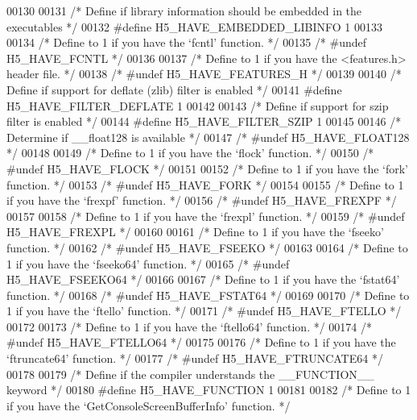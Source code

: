 \begin{DoxyCode}
{00130 
00131 \textcolor{comment}{/* Define if library information should be embedded in the executables */}
00132 \textcolor{preprocessor}{#define H5\_HAVE\_EMBEDDED\_LIBINFO 1}
00133 
00134 \textcolor{comment}{/* Define to 1 if you have the `fcntl' function. */}
00135 \textcolor{comment}{/* #undef H5\_HAVE\_FCNTL */}
00136 
00137 \textcolor{comment}{/* Define to 1 if you have the <features.h> header file. */}
00138 \textcolor{comment}{/* #undef H5\_HAVE\_FEATURES\_H */}
00139 
00140 \textcolor{comment}{/* Define if support for deflate (zlib) filter is enabled */}
00141 \textcolor{preprocessor}{#define H5\_HAVE\_FILTER\_DEFLATE 1}
00142 
00143 \textcolor{comment}{/* Define if support for szip filter is enabled */}
00144 \textcolor{preprocessor}{#define H5\_HAVE\_FILTER\_SZIP 1}
00145 
00146 \textcolor{comment}{/* Determine if \_\_float128 is available */}
00147 \textcolor{comment}{/* #undef H5\_HAVE\_FLOAT128 */}
00148 
00149 \textcolor{comment}{/* Define to 1 if you have the `flock' function. */}
00150 \textcolor{comment}{/* #undef H5\_HAVE\_FLOCK */}
00151 
00152 \textcolor{comment}{/* Define to 1 if you have the `fork' function. */}
00153 \textcolor{comment}{/* #undef H5\_HAVE\_FORK */}
00154 
00155 \textcolor{comment}{/* Define to 1 if you have the `frexpf' function. */}
00156 \textcolor{comment}{/* #undef H5\_HAVE\_FREXPF */}
00157 
00158 \textcolor{comment}{/* Define to 1 if you have the `frexpl' function. */}
00159 \textcolor{comment}{/* #undef H5\_HAVE\_FREXPL */}
00160 
00161 \textcolor{comment}{/* Define to 1 if you have the `fseeko' function. */}
00162 \textcolor{comment}{/* #undef H5\_HAVE\_FSEEKO */}
00163 
00164 \textcolor{comment}{/* Define to 1 if you have the `fseeko64' function. */}
00165 \textcolor{comment}{/* #undef H5\_HAVE\_FSEEKO64 */}
00166 
00167 \textcolor{comment}{/* Define to 1 if you have the `fstat64' function. */}
00168 \textcolor{comment}{/* #undef H5\_HAVE\_FSTAT64 */}
00169 
00170 \textcolor{comment}{/* Define to 1 if you have the `ftello' function. */}
00171 \textcolor{comment}{/* #undef H5\_HAVE\_FTELLO */}
00172 
00173 \textcolor{comment}{/* Define to 1 if you have the `ftello64' function. */}
00174 \textcolor{comment}{/* #undef H5\_HAVE\_FTELLO64 */}
00175 
00176 \textcolor{comment}{/* Define to 1 if you have the `ftruncate64' function. */}
00177 \textcolor{comment}{/* #undef H5\_HAVE\_FTRUNCATE64 */}
00178 
00179 \textcolor{comment}{/* Define if the compiler understands the \_\_FUNCTION\_\_ keyword */}
00180 \textcolor{preprocessor}{#define H5\_HAVE\_FUNCTION 1}
00181 
00182 \textcolor{comment}{/* Define to 1 if you have the `GetConsoleScreenBufferInfo' function. */}
}
\end{DoxyCode}
